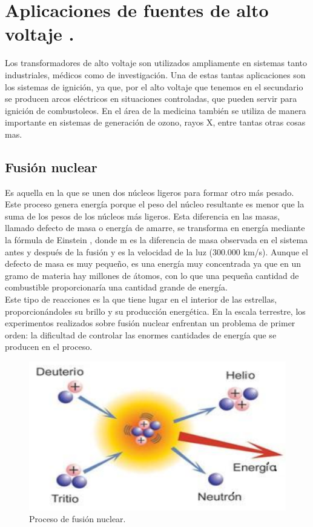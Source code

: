 \section{Aplicaciones de fuentes de alto voltaje .}

Los transformadores de alto voltaje son utilizados ampliamente en sistemas tanto industriales, médicos como de investigación. Una de estas tantas aplicaciones son los sistemas de ignición, ya que, por el alto voltaje que tenemos en el secundario se producen arcos eléctricos en situaciones controladas, que pueden servir para ignición de combustoleos. En el área de la medicina también se utiliza de manera importante en sistemas de generación de ozono, rayos X, entre tantas otras cosas mas.  \\
\subsection{Fusión nuclear}

Es aquella en la que se unen dos núcleos ligeros para formar otro más pesado. Este proceso genera energía porque el peso del núcleo resultante es menor que la suma de los pesos de los núcleos más ligeros. Esta diferencia en las masas, llamado defecto de masa o energía de amarre, se transforma en energía mediante la fórmula de Einstein , donde m es la diferencia de masa observada en el sistema antes y después de la fusión y es la velocidad de la luz (300.000 km/s). Aunque el defecto de masa es muy pequeño, es una energía muy concentrada ya que en un gramo de materia hay millones de átomos, con lo que una pequeña cantidad de combustible proporcionaría una cantidad grande de energía.\\

Este tipo de reacciones es la que tiene lugar en el interior de las estrellas, proporcionándoles su brillo y su producción energética. En la escala terrestre, los experimentos realizados sobre fusión nuclear enfrentan un problema de primer orden: la dificultad de controlar las enormes cantidades de energía que se producen en el proceso.


\begin{figure}[H]
\centering
\includegraphics[width=12cm]{capitulo3/figs/fusi.png}
\caption{ Proceso de fusión nuclear.}
\end{figure}

